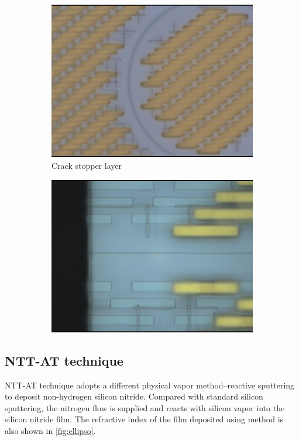 \begin{figure}
\begin{subfigure}[b]{0.45\textwidth}
		\includegraphics[width=\textwidth]{imgs/jpg/ligentec/cross}
		\caption{Crack stopper layer}
	\end{subfigure}
	\begin{subfigure}[b]{0.45\textwidth}
		\includegraphics[width=\textwidth]{imgs/jpg/ligentec/cov}
		\caption{}
	\end{subfigure}
	\label{fig:ligentec-laser-micro}
\end{figure}
\subsection{NTT-AT technique}

NTT-AT technique adopts a different physical vapor method--reactive sputtering to deposit non-hydrogen silicon nitride. Compared with standard silicon sputtering, the nitrogen flow is supplied and reacts with silicon vapor into the silicon nitride film. The refractive index of the film deposited using method is also shown in \autoref{fig:ellipso}.



